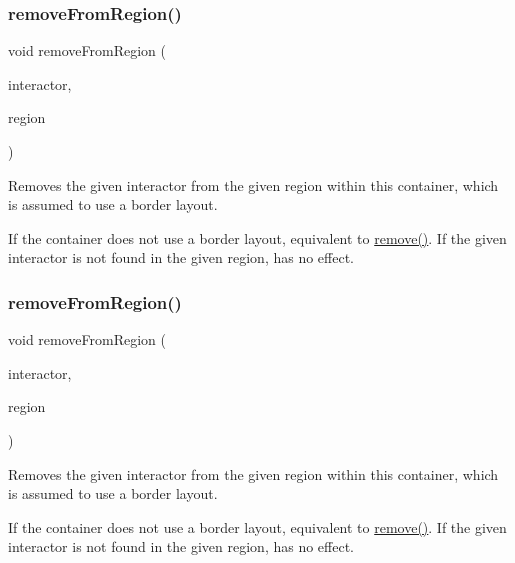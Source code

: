 \subsubsection{\texorpdfstring{remove\+From\+Region()}{removeFromRegion()}\hspace{0.1cm}{\footnotesize\ttfamily [3/6]}}
{\footnotesize\ttfamily void remove\+From\+Region (\begin{DoxyParamCaption}\item[{\mbox{\hyperlink{classGInteractor}{G\+Interactor}} \&}]{interactor,  }\item[{\mbox{\hyperlink{classGContainer_a81a01a86de31071a92e6cce0bab9bc4b}{Region}}}]{region }\end{DoxyParamCaption})\hspace{0.3cm}{\ttfamily [virtual]}}



Removes the given interactor from the given region within this container, which is assumed to use a border layout. 

If the container does not use a border layout, equivalent to \mbox{\hyperlink{classGContainer_a1c12b1fde5c2ef10d79d4ee51e670efa}{remove()}}. If the given interactor is not found in the given region, has no effect. \mbox{\label{classGContainer_af7a055c83c0e0e3f3722596d7111fcbe}} 
\subsubsection{\texorpdfstring{remove\+From\+Region()}{removeFromRegion()}\hspace{0.1cm}{\footnotesize\ttfamily [4/6]}}
{\footnotesize\ttfamily void remove\+From\+Region (\begin{DoxyParamCaption}\item[{\mbox{\hyperlink{classGInteractor}{G\+Interactor}} \&}]{interactor,  }\item[{const std\+::string \&}]{region }\end{DoxyParamCaption})\hspace{0.3cm}{\ttfamily [virtual]}}



Removes the given interactor from the given region within this container, which is assumed to use a border layout. 

If the container does not use a border layout, equivalent to \mbox{\hyperlink{classGContainer_a1c12b1fde5c2ef10d79d4ee51e670efa}{remove()}}. If the given interactor is not found in the given region, has no effect. \mbox{\label{classGContainer_a15e3a1d3f3abecc00d68d6df2349f360}} 
